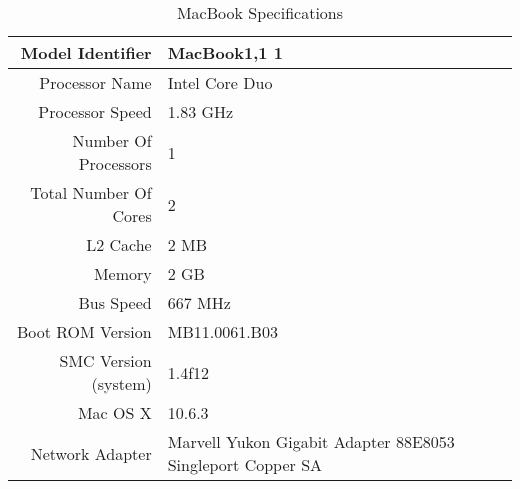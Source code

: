   \begin{table}[tbp]
    \begin{center}
    \begin{tabular}{| r | p{5cm} |}
      \hline
      Model Identifier      & MacBook1,1 1 \\ \hline
      Processor Name        & Intel Core Duo \\ \hline
      Processor Speed       & 1.83 GHz \\ \hline
      Number Of Processors  & 1 \\ \hline
      Total Number Of Cores & 2 \\ \hline
      L2 Cache              & 2 MB \\ \hline
      Memory                & 2 GB \\ \hline
      Bus Speed             & 667 MHz \\ \hline
      Boot ROM Version      & MB11.0061.B03 \\ \hline
      SMC Version (system)  & 1.4f12 \\ \hline
      Mac OS X              & 10.6.3 \\ \hline
      Network  Adapter      & Marvell Yukon Gigabit Adapter 88E8053 Singleport
      Copper SA \\
      \hline
    \end{tabular}
    \caption{MacBook Specifications}
    \label{macbookSpecs}
    \end{center}
  \end{table}
